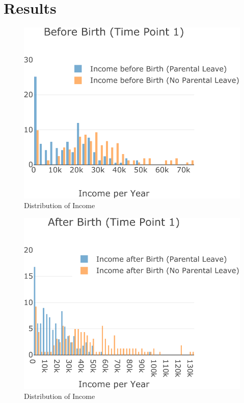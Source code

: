 \documentclass[
  12pt,
]{article}
\begin{document}
\hypertarget{results}{%
\section{Results}\label{results}}

\begin{figure}

{\centering \includegraphics{Parental_Leave-Finalizing-Data-Set_files/figure-latex/fig-1-1} 

}

\caption{Distribution of Income}\label{fig:fig-1}
\end{figure}

\begin{figure}

{\centering \includegraphics{Parental_Leave-Finalizing-Data-Set_files/figure-latex/fig-2-1} 

}

\caption{Distribution of Income}\label{fig:fig-2}
\end{figure}
\end{document}
